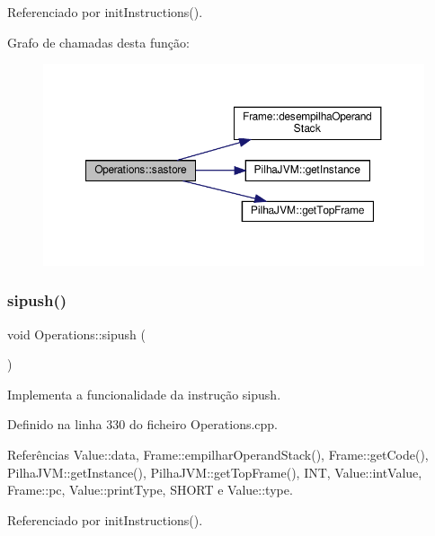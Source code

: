 Referenciado por init\+Instructions().

Grafo de chamadas desta função\+:\nopagebreak
\begin{figure}[H]
\begin{center}
\leavevmode
\includegraphics[width=350pt]{classOperations_aab1c34c455478d75c21cdb06d6c94172_cgraph}
\end{center}
\end{figure}
\mbox{\label{classOperations_aed3838c73d7febfcacab9f101e6946ad}} 
\subsubsection{\texorpdfstring{sipush()}{sipush()}}
{\footnotesize\ttfamily void Operations\+::sipush (\begin{DoxyParamCaption}{ }\end{DoxyParamCaption})\hspace{0.3cm}{\ttfamily [private]}}



Implementa a funcionalidade da instrução sipush. 



Definido na linha 330 do ficheiro Operations.\+cpp.



Referências Value\+::data, Frame\+::empilhar\+Operand\+Stack(), Frame\+::get\+Code(), Pilha\+J\+V\+M\+::get\+Instance(), Pilha\+J\+V\+M\+::get\+Top\+Frame(), I\+NT, Value\+::int\+Value, Frame\+::pc, Value\+::print\+Type, S\+H\+O\+RT e Value\+::type.



Referenciado por init\+Instructions().

